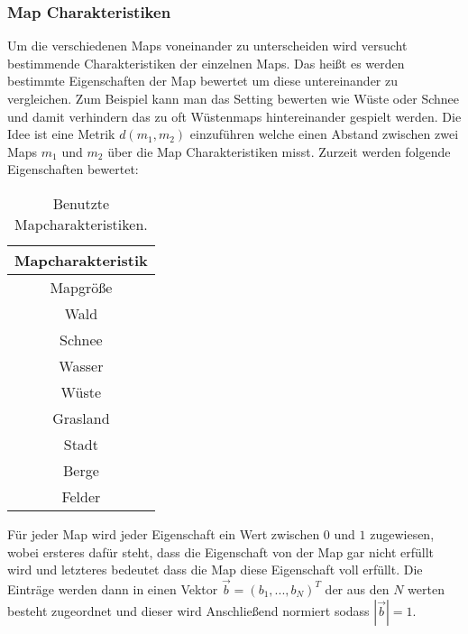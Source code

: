         \subsubsection{Map Charakteristiken}
            Um die verschiedenen Maps voneinander zu unterscheiden wird versucht bestimmende Charakteristiken der einzelnen Maps.
            Das heißt es werden bestimmte Eigenschaften der Map bewertet um diese untereinander zu vergleichen.
            Zum Beispiel kann man das \glqq{}Setting\grqq{} bewerten wie \glqq{}Wüste\grqq{} oder \glqq{}Schnee\grqq{} und damit verhindern das zu oft Wüstenmaps hintereinander gespielt werden.
            Die Idee ist eine Metrik $d(m_1,m_2)$ einzuführen welche einen \glqq{}Abstand\grqq{} zwischen zwei Maps $m_1$ und $m_2$ über die Map Charakteristiken misst.
            Zurzeit werden folgende Eigenschaften bewertet:
            \begin{table}[h]
                \centering
                \begin{tabular}{|| c ||}
                    \hline
                    \textbf{Mapcharakteristik}  \\
                    \hline
                    \hline
                    Mapgröße \\
                    \hline
                    Wald \\
                    \hline
                    Schnee \\
                    \hline
                    Wasser \\
                    \hline
                    Wüste \\
                    \hline
                    Grasland \\
                    \hline
                    Stadt \\
                    \hline
                    Berge \\
                    \hline
                    Felder \\
                    \hline
                \end{tabular}
                \caption{Benutzte Mapcharakteristiken.}
                \label{t:Aufbau:Charakteristiken}
            \end{table}
            Für jeder Map wird jeder Eigenschaft ein Wert zwischen $0$ und $1$ zugewiesen, wobei ersteres dafür steht, dass die Eigenschaft von der Map gar nicht erfüllt wird und letzteres bedeutet dass die Map diese Eigenschaft voll erfüllt. 
            Die Einträge werden dann in einen Vektor $\vec{b}=(b_1,...,b_N)^T$ der aus den $N$ werten besteht zugeordnet und dieser wird Anschließend normiert sodass $|\vec{b}|=1$.

